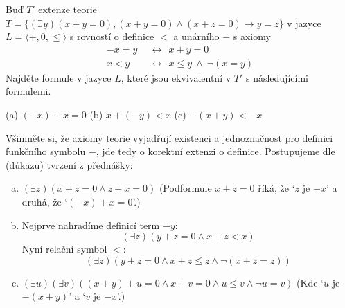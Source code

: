 \begin{problem}

    Buď $T'$ extenze teorie $T=\{(\exists y)(x+y=0),(x+y=0)\wedge (x+z=0)\rightarrow y=z\}$ v jazyce $L=\langle +,0,\le\rangle$ s rovností o definice $<$ a unárního $-$ s axiomy
    \begin{align*}
        -x=y\ \ &\leftrightarrow\ \ x+y=0\\
        x<y\ \ &\leftrightarrow\ \ x\le y\ \wedge\ \neg(x=y)
    \end{align*}
    Najděte formule v jazyce $L$, které jsou ekvivalentní v $T'$ s následujícími formulemi.
        
    (a) $(-x)+x=0$ \hfill (b) $x+(-y)<x$ \hfill (c) $-(x+y)<-x$\hfill{}

    \begin{solution}

        Všimněte si, že axiomy teorie vyjadřují existenci a jednoznačnost pro definici funkčního symbolu $-$, jde tedy o korektní extenzi o definice. Postupujeme dle (důkazu) tvrzení z přednášky:
        \begin{enumerate}[(a)]
            \item $(\exists z)(x+z=0\land z+x=0)$ (Podformule $x+z=0$ říká, že `$z$ je $-x$' a druhá, že `$(-x)+x=0$'.)
            \item Nejprve nahradíme definicí term $-y$: 
            $$
            (\exists z)(y+z=0\land x+z<x)
            $$
            Nyní relační symbol $<$:
            $$
            (\exists z)(y+z=0\land x+z\leq z\land\neg(x+z=z))
            $$
            \item $(\exists u)(\exists v)((x+y)+u=0\land x+v=0\land u\leq v\land \neg u=v)$ (Kde `$u$ je $-(x+y)$' a `$v$ je $-x$'.)
        \end{enumerate}
                    
    \end{solution}
    
\end{problem}


